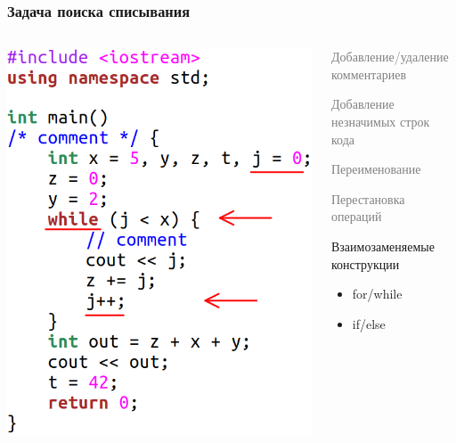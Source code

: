 \documentclass[10pt]{beamer}
\begin{document}
\begin{frame}[fragile]\frametitle{Задача поиска списывания}
	\centering
	\begin{columns}
		\centering
		\hspace*{-0.3cm}\includegraphics[scale=0.7]{control.png}
		
		\centering
		\begin{itemize}
			\item \textcolor{gray}{Добавление/удаление комментариев
				\item Добавление незначимых строк кода
				\item Переименование
			\item Перестановка операций}
				\item Взаимозаменяемые конструкции
			\begin{itemize}
				\item for/while
					\item if/else
			\end{itemize}
		\end{itemize}
	\end{columns}
\end{frame}
\end{document}
